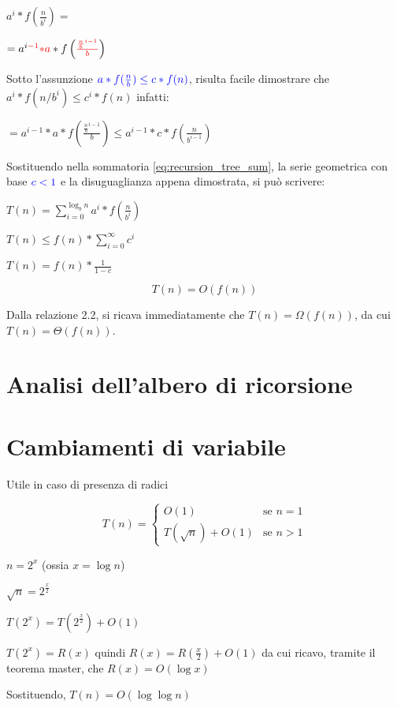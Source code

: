 $a^i * f\left(\frac{n}{b^i}\right)=$

$=a^{i\textcolor{red}{-1}} \textcolor{red}{* a} * f\left(\textcolor{red}{\frac{\frac{n}{b}^{i-1}}{b}}\right)$

Sotto l'assunzione $\textcolor{blue}{a*f(\frac{n}{b}) \leq c*f(n)}$, risulta facile dimostrare che $a^i * f(n/b^i) \leq c^i * f(n)$ infatti:

$=a^{i-1} * a * f\left(\frac{\frac{n}{b}^{i-1}}{b}\right) \leq a^{i-1} * c * f\left(\frac{n}{b^{i-1}}\right)$

Sostituendo nella sommatoria \ref{eq:recursion_tree_sum}, la serie geometrica con base $\textcolor{blue}{c < 1}$ e la disuguaglianza appena dimostrata, si può scrivere:

$T(n) = \sum_{i=0}^{\log_b{n}}{a^i * f\left(\frac{n}{b^i}\right)}$

$T(n) \leq f(n) *  \sum_{i=0}^{\infty}{c^i}$

$T(n) = f(n) * \frac{1}{1-c}$

\begin{equation}
T(n) = O(f(n))
\end{equation}

Dalla relazione 2.2, si ricava immediatamente che $T(n) = \Omega(f(n))$, da cui $T(n) = \Theta(f(n))$.

\section{Analisi dell'albero di ricorsione}

\section{Cambiamenti di variabile}

Utile in caso di presenza di radici

\begin{equation}
T(n) = 
\begin{cases}
O(1)					& \mbox{se } n = 1\\ 
T(\sqrt{n}) + O(1)		& \mbox{se } n > 1
\end{cases}
\end{equation}

$n = 2^x$ (ossia $x = \log n$)

$\sqrt{n} = 2^{\frac{x}{2}}$

$T(2^x) = T(2^{\frac{x}{2}}) + O(1)$

$T(2^x) = R(x)$ quindi $R(x) = R(\frac{x}{2}) + O(1)$ da cui ricavo, tramite il teorema master, che $R(x) = O(\log x)$

Sostituendo, $T(n) = O(\log \log n)$


